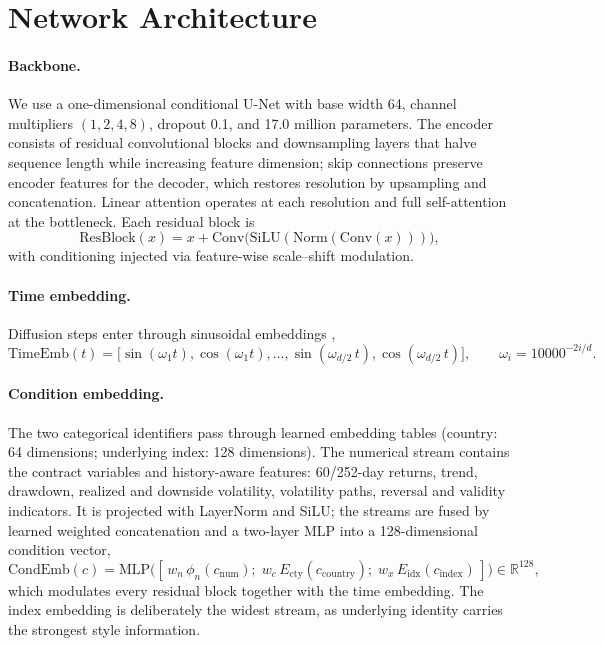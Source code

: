 ﻿\documentclass[12pt,letterpaper]{article}
\begin{document}
\appendix


\section{Network Architecture}\label{app:architecture}

\paragraph{Backbone.} We use a one-dimensional conditional U-Net
\citep{ronneberger2015unet} with base width 64, channel multipliers
$(1, 2, 4, 8)$, dropout 0.1, and 17.0 million parameters. The encoder
consists of residual convolutional blocks and downsampling layers that halve
sequence length while increasing feature dimension; skip connections
preserve encoder features for the decoder, which restores resolution by
upsampling and concatenation. Linear attention operates at each resolution
and full self-attention at the bottleneck. Each residual block is
\begin{equation}
\mathrm{ResBlock}(x) = x +
\mathrm{Conv}\bigl(\mathrm{SiLU}(\mathrm{Norm}(\mathrm{Conv}(x)))\bigr),
\end{equation}
with conditioning injected via feature-wise scale--shift modulation.

\paragraph{Time embedding.} Diffusion steps enter through sinusoidal
embeddings \citep{vaswani2017attention},
\begin{equation}
\mathrm{TimeEmb}(t) = \bigl[\sin(\omega_1 t), \cos(\omega_1 t), \ldots,
\sin(\omega_{d/2}\, t), \cos(\omega_{d/2}\, t)\bigr],
\qquad \omega_i = 10000^{-2i/d}.
\end{equation}

\paragraph{Condition embedding.} The two categorical identifiers pass
through learned embedding tables (country: 64 dimensions; underlying index:
128 dimensions). The numerical stream contains the contract variables and
history-aware features: 60/252-day returns, trend, drawdown, realized and
downside volatility, volatility paths, reversal and validity indicators. It
is projected with LayerNorm and SiLU; the streams are fused by learned
weighted concatenation and a two-layer MLP into a 128-dimensional condition
vector,
\begin{equation}
\mathrm{CondEmb}(c) = \mathrm{MLP}\bigl(
[\,w_n\,\phi_n(c_{\mathrm{num}});\;
  w_c\,E_{\mathrm{cty}}(c_{\mathrm{country}});\;
  w_x\,E_{\mathrm{idx}}(c_{\mathrm{index}})\,]\bigr) \in \mathbb{R}^{128},
\end{equation}
which modulates every residual block together with the time embedding. The
index embedding is deliberately the widest stream, as underlying identity
carries the strongest style information.
\end{document}
